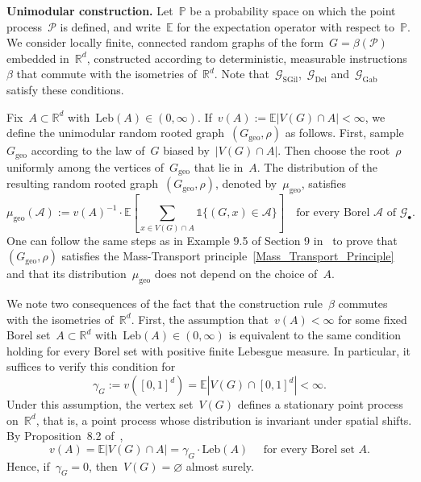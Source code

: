 \documentclass[a4paper,11pt]{article}
\newcommand{\EE}{\mathbb{E}}
\newcommand{\PP}{\mathbb{P}}
\newcommand{\RR}{\mathbb{R}}
\theoremstyle{definition}
\begin{document}
\noindent \textbf{Unimodular construction.} Let~$\PP$ be a probability space on which the point process~$\mathcal P$ is defined, and write~$\EE$ for the expectation operator with respect to~$\PP$. We consider locally finite, connected random graphs of the form~$G = \beta(\mathcal P)$ embedded in~$\mathbb{R}^d$, constructed according to deterministic, measurable instructions~$\beta$ that commute with the isometries of~$\mathbb{R}^d$. Note that~$\mathcal G_\mathrm{SGil}$,~$\mathcal G_\mathrm{Del}$ and~$\mathcal G_\mathrm{Gab}$ satisfy these conditions. 

Fix~$A \subset \RR^d$ with~$\mathrm{Leb}(A) \in (0,\infty)$. If~$v(A) := \EE |V(G) \cap A| < \infty $, we define the unimodular random rooted graph~$(G_\mathrm{geo},\rho)$ as follows. First, sample~$G_\mathrm{geo}$ according to the law of~$G$ biased by~$|V(G) \cap A|$. Then choose the root~$\rho$ uniformly among the vertices of~$G_\mathrm{geo}$ that lie in~$A$. The distribution of the resulting random rooted graph~$(G_\mathrm{geo},\rho)$, denoted by~$\mu_\mathrm{geo}$, satisfies
\begin{equation}\label{eq_unimodular_H}
    \mu_\mathrm{geo}(\mathcal A) := v(A)^{-1} \cdot \EE \left[  \sum_{x \in V(G) \cap A}\mathds{1}\{ (G,x) \in \mathcal A \} \right] \quad \text{for every Borel }  \mathcal A \text{ of } \mathcal G_\bullet.
\end{equation}
One can follow the same steps as in Example 9.5 of Section 9 in~\cite{AldousLyons2007} to prove that~$(G_\mathrm{geo},\rho)$ satisfies the Mass-Transport principle~\eqref{Mass_Transport_Principle} and that its distribution~$\mu_\mathrm{geo}$ does not depend on the choice of~$A$. 

We note two consequences of the fact that the construction rule~$\beta$ commutes with the isometries of~$\mathbb{R}^d$. First, the assumption that~$v(A)< \infty$ for some fixed Borel set~$A \subset \RR^d$ with~$\mathrm{Leb}(A) \in (0,\infty)$ is equivalent to the same condition holding for every Borel set with positive finite Lebesgue measure. In particular, it suffices to verify this condition for
\begin{equation}\label{eq_gamma_G_def}
\gamma_G := v([0,1]^d) = \EE |V(G) \cap [0,1]^d|  < \infty.
\end{equation}
Under this assumption, the vertex set~$V(G)$ defines a stationary point process on~$\RR^d$, that is, a point process whose distribution is invariant under spatial shifts. By Proposition~8.2 of~\cite{LastPenrose2017},
$$ v(A) = \EE | V(G) \cap A| = \gamma_G \cdot \mathrm{Leb}(A) \quad  \text{ for every Borel set } A.$$
Hence, if~$\gamma_G = 0$, then~$V(G) = \varnothing$ almost surely. 
\end{document}
